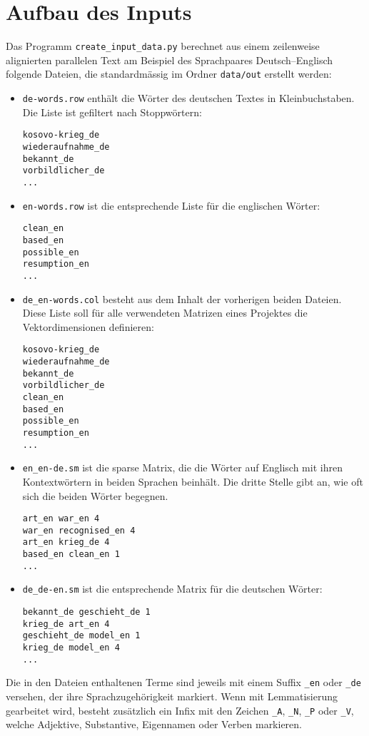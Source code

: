 \documentclass[11pt,twoside,openright]{mpreport}
\begin{document}
\chapter{Aufbau des Inputs}
\label{cha:input}
Das Programm \verb+create_input_data.py+ berechnet aus einem zeilenweise alignierten parallelen Text am Beispiel des Sprachpaares Deutsch--Englisch folgende Dateien, die standardmässig im Ordner \verb+data/out+ erstellt werden:
\begin{itemize}
\item \verb+de-words.row+ enthält die Wörter des deutschen Textes in Kleinbuchstaben. Die Liste ist gefiltert nach Stoppwörtern:
\begin{verbatim}
kosovo-krieg_de
wiederaufnahme_de
bekannt_de
vorbildlicher_de
...
\end{verbatim}
\item \verb+en-words.row+ ist die entsprechende Liste für die englischen Wörter:
\begin{verbatim}
clean_en
based_en
possible_en
resumption_en
...
\end{verbatim}
\item \verb+de_en-words.col+ besteht aus dem Inhalt der vorherigen beiden Dateien. Diese Liste soll für alle verwendeten Matrizen eines Projektes die Vektordimensionen definieren:
\begin{verbatim}
kosovo-krieg_de
wiederaufnahme_de
bekannt_de
vorbildlicher_de
clean_en
based_en
possible_en
resumption_en
...
\end{verbatim}
\item \verb+en_en-de.sm+ ist die sparse Matrix, die die Wörter auf Englisch mit ihren Kontextwörtern in beiden Sprachen beinhält. Die dritte Stelle gibt an, wie oft sich die beiden Wörter begegnen. 
\begin{verbatim}
art_en war_en 4
war_en recognised_en 4
art_en krieg_de 4
based_en clean_en 1
...
\end{verbatim}
\item \verb+de_de-en.sm+ ist die entsprechende Matrix für die deutschen Wörter:
\begin{verbatim}
bekannt_de geschieht_de 1
krieg_de art_en 4
geschieht_de model_en 1
krieg_de model_en 4
...
\end{verbatim}
\end{itemize}
Die in den Dateien enthaltenen Terme sind jeweils mit einem Suffix \verb+_en+ oder \verb+_de+ versehen, der ihre Sprachzugehörigkeit markiert. Wenn mit
Lemmatisierung gearbeitet wird, besteht zusätzlich ein Infix mit den Zeichen \verb+_A+, \verb+_N+, \verb+_P+ oder \verb+_V+, welche Adjektive, Substantive,
Eigennamen oder Verben markieren.
\end{document}
